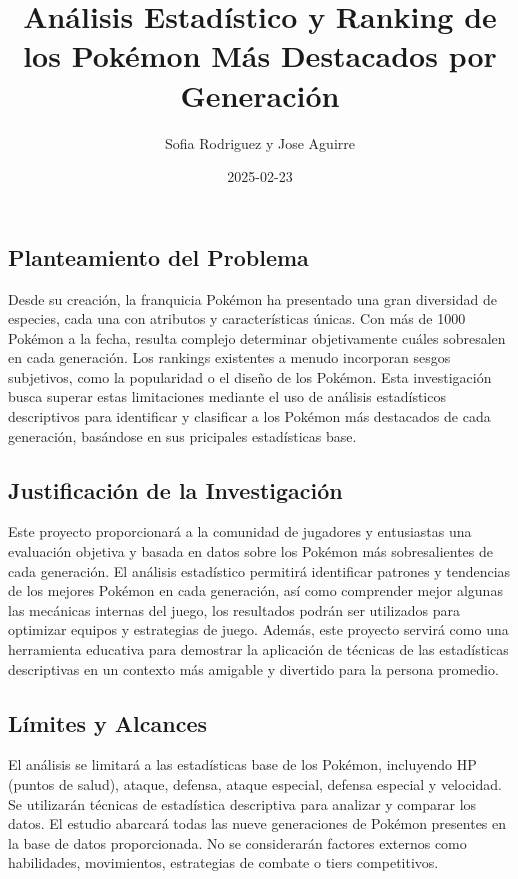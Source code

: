 \documentclass[
]{article}
\title{Análisis Estadístico y Ranking de los Pokémon Más Destacados por
Generación}
\author{Sofia Rodriguez y Jose Aguirre}
\date{2025-02-23}
\begin{document}
\maketitle

\subsection{Planteamiento del
Problema}\label{planteamiento-del-problema}

Desde su creación, la franquicia Pokémon ha presentado una gran
diversidad de especies, cada una con atributos y características únicas.
Con más de 1000 Pokémon a la fecha, resulta complejo determinar
objetivamente cuáles sobresalen en cada generación. Los rankings
existentes a menudo incorporan sesgos subjetivos, como la popularidad o
el diseño de los Pokémon. Esta investigación busca superar estas
limitaciones mediante el uso de análisis estadísticos descriptivos para
identificar y clasificar a los Pokémon más destacados de cada
generación, basándose en sus pricipales estadísticas base.

\subsection{Justificación de la
Investigación}\label{justificaciuxf3n-de-la-investigaciuxf3n}

Este proyecto proporcionará a la comunidad de jugadores y entusiastas
una evaluación objetiva y basada en datos sobre los Pokémon más
sobresalientes de cada generación. El análisis estadístico permitirá
identificar patrones y tendencias de los mejores Pokémon en cada
generación, así como comprender mejor algunas las mecánicas internas del
juego, los resultados podrán ser utilizados para optimizar equipos y
estrategias de juego. Además, este proyecto servirá como una herramienta
educativa para demostrar la aplicación de técnicas de las estadísticas
descriptivas en un contexto más amigable y divertido para la persona
promedio.

\subsection{Límites y Alcances}\label{luxedmites-y-alcances}

El análisis se limitará a las estadísticas base de los Pokémon,
incluyendo HP (puntos de salud), ataque, defensa, ataque especial,
defensa especial y velocidad. Se utilizarán técnicas de estadística
descriptiva para analizar y comparar los datos. El estudio abarcará
todas las nueve generaciones de Pokémon presentes en la base de datos
proporcionada. No se considerarán factores externos como habilidades,
movimientos, estrategias de combate o tiers competitivos.
\end{document}
